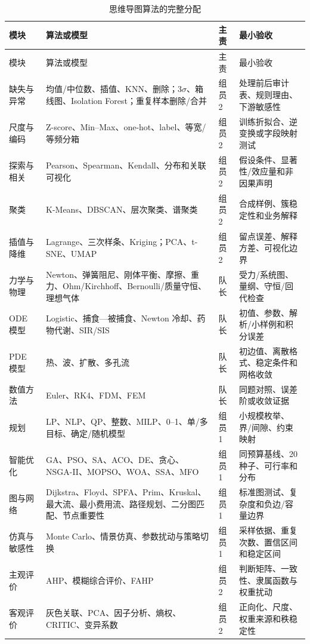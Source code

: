 \documentclass[UTF8,a4paper,12pt]{ctexart}
\begin{document}
{\begin{longtable}{p{2.1cm}p{5.0cm}p{2.0cm}p{5.5cm}}
\caption{思维导图算法的完整分配}\label{tab:algorithm-owner}\\
\toprule
模块 & 算法或模型 & 主责 & 最小验收\\
\midrule
\endfirsthead
\toprule
模块 & 算法或模型 & 主责 & 最小验收\\
\midrule
\endhead
缺失与异常 & 均值/中位数、插值、KNN、删除；$3\sigma$、箱线图、Isolation Forest；重复样本删除/合并 & 组员2 & 处理前后审计表、规则理由、下游敏感性\\
尺度与编码 & Z-score、Min--Max、one-hot、label、等宽/等频分箱 & 组员2 & 训练折拟合、逆变换或字段映射测试\\
探索与相关 & Pearson、Spearman、Kendall、分布和关联可视化 & 组员2 & 假设条件、显著性/效应量和非因果声明\\
聚类 & K-Means、DBSCAN、层次聚类、谱聚类 & 组员2 & 合成样例、簇稳定性和业务解释\\
插值与降维 & Lagrange、三次样条、Kriging；PCA、t-SNE、UMAP & 组员2 & 留点误差、解释方差、可视化边界\\
力学与物理 & Newton、弹簧阻尼、刚体平衡、摩擦、重力、Ohm/Kirchhoff、Bernoulli/质量守恒、理想气体 & 队长 & 受力/系统图、量纲、守恒/回代检查\\
ODE 模型 & Logistic、捕食—被捕食、Newton 冷却、药物代谢、SIR/SIS & 队长 & 初值、参数、解析/小样例和积分误差\\
PDE 模型 & 热、波、扩散、多孔流 & 队长 & 初边值、离散格式、稳定条件和网格收敛\\
数值方法 & Euler、RK4、FDM、FEM & 队长 & 同题对照、误差阶或收敛证据\\
规划 & LP、NLP、QP、整数、MILP、0--1、单/多目标、确定/随机模型 & 组员1 & 小规模枚举、界/间隙、约束映射\\
智能优化 & GA、PSO、SA、ACO、DE、贪心、NSGA-II、MOPSO、WOA、SSA、MFO & 组员1 & 同预算基线、20 种子、可行率和分布\\
图与网络 & Dijkstra、Floyd、SPFA、Prim、Kruskal、最大流、最小费用流、路径规划、二分图匹配、节点重要性 & 组员1 & 标准图测试、复杂度和负边/容量边界\\
仿真与敏感性 & Monte Carlo、情景仿真、参数扰动与策略切换 & 组员1 & 采样依据、重复次数、置信区间和稳定区间\\
主观评价 & AHP、模糊综合评价、FAHP & 组员2 & 判断矩阵、一致性、隶属函数与权重扰动\\
客观评价 & 灰色关联、PCA、因子分析、熵权、CRITIC、变异系数 & 组员2 & 正向化、尺度、权重来源和秩稳定性\\

\end{longtable}}
\end{document}

